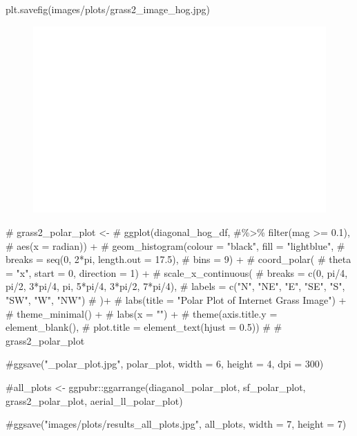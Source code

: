 \documentclass[
  letterpaper,
  DIV=11,
  numbers=noendperiod]{scrreprt}
\newenvironment{Shaded}{\begin{snugshade}}{\end{snugshade}}
\newcommand{\CommentTok}[1]{\textcolor[rgb]{0.37,0.37,0.37}{#1}}
\newcommand{\NormalTok}[1]{\textcolor[rgb]{0.00,0.23,0.31}{#1}}
\newcommand{\StringTok}[1]{\textcolor[rgb]{0.13,0.47,0.30}{#1}}
\begin{document}
\begin{Shaded}
\begin{Highlighting}[]
\NormalTok{plt.savefig(}\StringTok{\textquotesingle{}images/plots/grass2\_image\_hog.jpg\textquotesingle{}}\NormalTok{)}
\end{Highlighting}
\end{Shaded}

\begin{figure}[H]

{\centering \includegraphics{results_files/figure-pdf/unnamed-chunk-30-2.pdf}

}

\end{figure}

\begin{Shaded}
\begin{Highlighting}[]
\CommentTok{\# grass2\_polar\_plot \textless{}{-}}
\CommentTok{\# ggplot(diagonal\_hog\_df, \#\%\textgreater{}\% filter(mag \textgreater{}= 0.1), }
\CommentTok{\#        aes(x = radian)) +}
\CommentTok{\#   geom\_histogram(colour = "black", fill = "lightblue", }
\CommentTok{\#                  breaks = seq(0, 2*pi, length.out = 17.5),}
\CommentTok{\#                  bins = 9) +}
\CommentTok{\#   coord\_polar(}
\CommentTok{\#     theta = "x", start = 0, direction = 1) +}
\CommentTok{\#   scale\_x\_continuous(}
\CommentTok{\#     breaks = c(0, pi/4, pi/2, 3*pi/4, pi, 5*pi/4, 3*pi/2, 7*pi/4), }
\CommentTok{\#     labels = c("N", "NE", "E", "SE", "S", "SW", "W", "NW")}
\CommentTok{\#   )+}
\CommentTok{\#   labs(title = "Polar Plot of Internet Grass Image") +}
\CommentTok{\#     theme\_minimal() +}
\CommentTok{\#   labs(x = "") +}
\CommentTok{\#   theme(axis.title.y = element\_blank(),}
\CommentTok{\#         plot.title = element\_text(hjust = 0.5))}
\CommentTok{\# }
\CommentTok{\# grass2\_polar\_plot}

\CommentTok{\#ggsave("\_polar\_plot.jpg", polar\_plot, width = 6, height = 4, dpi = 300)}

\CommentTok{\#all\_plots \textless{}{-} ggpubr::ggarrange(diaganol\_polar\_plot, sf\_polar\_plot, grass2\_polar\_plot, aerial\_ll\_polar\_plot)}

\CommentTok{\#ggsave("images/plots/results\_all\_plots.jpg", all\_plots, width = 7, height = 7)}
\end{Highlighting}
\end{Shaded}
\end{document}
